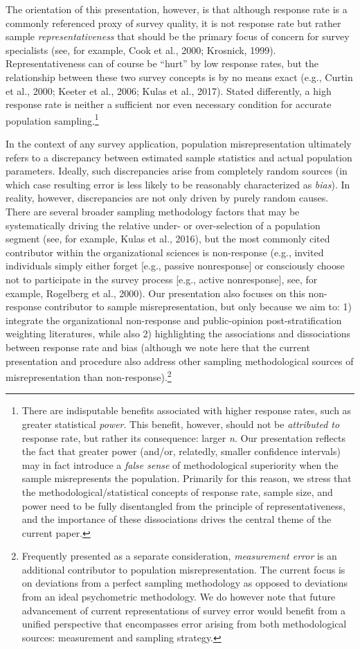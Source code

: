 \documentclass[
  man,mask]{apa7}
\begin{document}
The orientation of this presentation, however, is that although response rate is a commonly referenced proxy of survey quality, it is not response rate but rather sample \emph{representativeness} that should be the primary focus of concern for survey specialists (see, for example, Cook et al., 2000; Krosnick, 1999). Representativeness can of course be ``hurt'' by low response rates, but the relationship between these two survey concepts is by no means exact (e.g., Curtin et al., 2000; Keeter et al., 2006; Kulas et al., 2017). Stated differently, a high response rate is neither a sufficient nor even necessary condition for accurate population sampling.\footnote{There are indisputable benefits associated with higher response rates, such as greater statistical \emph{power}. This benefit, however, should not be \emph{attributed to} response rate, but rather its consequence: larger \emph{n}. Our presentation reflects the fact that greater power (and/or, relatedly, smaller confidence intervals) may in fact introduce a \emph{false sense} of methodological superiority when the sample misrepresents the population. Primarily for this reason, we stress that the methodological/statistical concepts of response rate, sample size, and power need to be fully disentangled from the principle of representativeness, and the importance of these dissociations drives the central theme of the current paper.}

In the context of any survey application, population misrepresentation ultimately refers to a discrepancy between estimated sample statistics and actual population parameters. Ideally, such discrepancies arise from completely random sources (in which case resulting error is less likely to be reasonably characterized as \emph{bias}). In reality, however, discrepancies are not only driven by purely random causes. There are several broader sampling methodology factors that may be systematically driving the relative under- or over-selection of a population segment (see, for example, Kulas et al., 2016), but the most commonly cited contributor within the organizational sciences is non-response (e.g., invited individuals simply either forget {[}e.g., passive nonresponse{]} or consciously choose not to participate in the survey process {[}e.g., active nonresponse{]}, see, for example, Rogelberg et al., 2000). Our presentation also focuses on this non-response contributor to sample misrepresentation, but only because we aim to: 1) integrate the organizational non-response and public-opinion post-stratification weighting literatures, while also 2) highlighting the associations and dissociations between response rate and bias (although we note here that the current presentation and procedure also address other sampling methodological sources of misrepresentation than non-response).\footnote{Frequently presented as a separate consideration, \emph{measurement error} is an additional contributor to population misrepresentation. The current focus is on deviations from a perfect sampling methodology as opposed to deviations from an ideal psychometric methodology. We do however note that future advancement of current representations of survey error would benefit from a unified perspective that encompasses error arising from both methodological sources: measurement and sampling strategy.}
\end{document}
